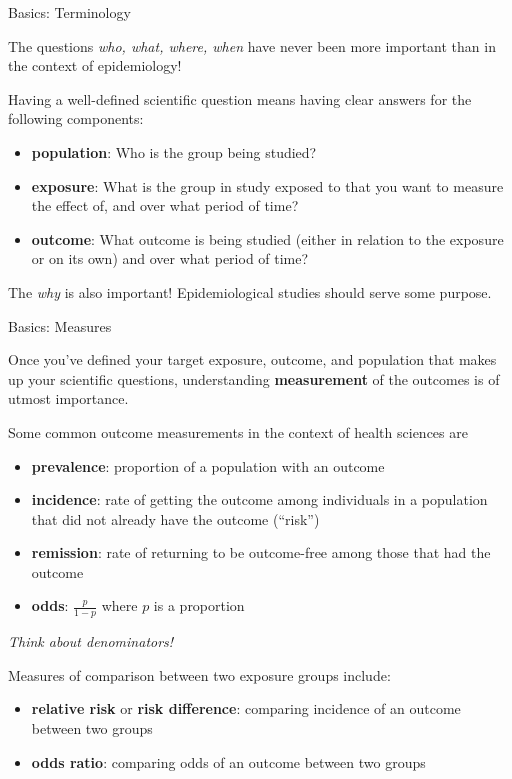 \documentclass[ignorenonframetext,]{beamer}
\providecommand{\tightlist}{%
  \setlength{\itemsep}{0pt}\setlength{\parskip}{0pt}}
\begin{document}
\begin{frame}{Basics: Terminology}
\protect\hypertarget{basics-terminology}{}

The questions \emph{who, what, where, when} have never been more
important than in the context of epidemiology!

Having a well-defined scientific question means having clear answers for
the following components:

\begin{itemize}
\tightlist
\item
  \textbf{population}: Who is the group being studied?
\item
  \textbf{exposure}: What is the group in study exposed to that you want
  to measure the effect of, and over what period of time?
\item
  \textbf{outcome}: What outcome is being studied (either in relation to
  the exposure or on its own) and over what period of time?
\end{itemize}

The \emph{why} is also important! Epidemiological studies should serve
some purpose.

\end{frame}

\begin{frame}{Basics: Measures}
\protect\hypertarget{basics-measures}{}

Once you've defined your target exposure, outcome, and population that
makes up your scientific questions, understanding \textbf{measurement}
of the outcomes is of utmost importance.

Some common outcome measurements in the context of health sciences are

\begin{itemize}
\tightlist
\item
  \textbf{prevalence}: proportion of a population with an outcome
\item
  \textbf{incidence}: rate of getting the outcome among individuals in a
  population that did not already have the outcome (``risk'')
\item
  \textbf{remission}: rate of returning to be outcome-free among those
  that had the outcome
\item
  \textbf{odds}: \(\frac{p}{1 - p}\) where \(p\) is a proportion
\end{itemize}

\emph{Think about denominators!}

Measures of comparison between two exposure groups include:

\begin{itemize}
\tightlist
\item
  \textbf{relative risk} or \textbf{risk difference}: comparing
  incidence of an outcome between two groups
\item
  \textbf{odds ratio}: comparing odds of an outcome between two groups
\end{itemize}

\end{frame}
\end{document}

